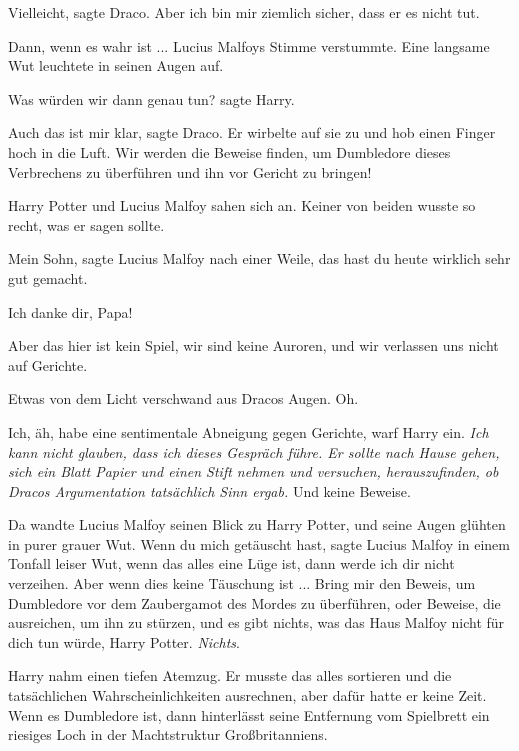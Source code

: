 \glqq{}Vielleicht\grqq{}, sagte Draco. \glqq{}Aber ich bin mir ziemlich sicher,
dass er es nicht tut.\grqq{}

\glqq{}Dann, wenn es wahr ist ...\grqq{} Lucius Malfoys Stimme verstummte. Eine
langsame Wut leuchtete in seinen Augen auf.

\glqq{}Was würden wir dann genau tun?\grqq{} sagte Harry.

\glqq{}Auch das ist mir klar\grqq{}, sagte Draco. Er wirbelte auf sie zu und hob
einen Finger hoch in die Luft. \glqq{}Wir werden die Beweise finden, um
Dumbledore dieses Verbrechens zu überführen und ihn vor Gericht zu
bringen!\grqq{}

Harry Potter und Lucius Malfoy sahen sich an. Keiner von beiden wusste so recht,
was er sagen sollte.

\glqq{}Mein Sohn\grqq{}, sagte Lucius Malfoy nach einer Weile, \glqq{}das hast du
heute wirklich sehr gut gemacht.\grqq{}

\glqq{}Ich danke dir, Papa!\grqq{}

\glqq{}Aber das hier ist kein Spiel, wir sind keine Auroren, und wir verlassen
uns nicht auf Gerichte.\grqq{}

Etwas von dem Licht verschwand aus Dracos Augen. \glqq{}Oh.\grqq{}

\glqq{}Ich, äh, habe eine sentimentale Abneigung gegen Gerichte\grqq{}, warf
Harry ein. \emph{Ich kann nicht glauben, dass ich dieses Gespräch führe. Er
sollte nach Hause gehen, sich ein Blatt Papier und einen Stift nehmen und
versuchen, herauszufinden, ob Dracos Argumentation tatsächlich Sinn ergab.}
\glqq{}Und keine Beweise.\grqq{}

Da wandte Lucius Malfoy seinen Blick zu Harry Potter, und seine Augen glühten in
purer grauer Wut. \glqq{}Wenn du mich getäuscht hast\grqq{}, sagte Lucius Malfoy
in einem Tonfall leiser Wut, \glqq{}wenn das alles eine Lüge ist, dann werde ich
dir nicht verzeihen. Aber wenn dies keine Täuschung ist ... Bring mir den Beweis,
um Dumbledore vor dem Zaubergamot des Mordes zu überführen, oder Beweise, die
ausreichen, um ihn zu stürzen, und es gibt nichts, was das Haus Malfoy nicht für
dich tun würde, Harry Potter. \emph{Nichts}.\grqq{}

Harry nahm einen tiefen Atemzug. Er musste das alles sortieren und die
tatsächlichen Wahrscheinlichkeiten ausrechnen, aber dafür hatte er keine Zeit.
\glqq{}Wenn es Dumbledore ist, dann hinterlässt seine Entfernung vom Spielbrett
ein riesiges Loch in der Machtstruktur Großbritanniens.\grqq{}

